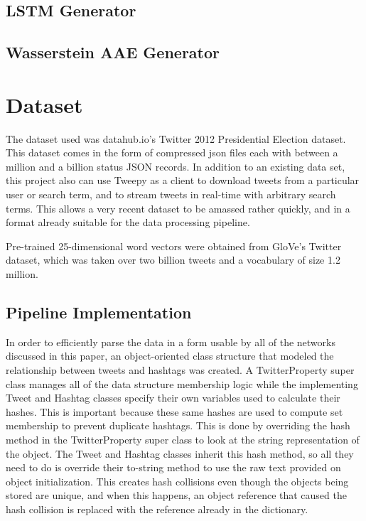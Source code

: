 \documentclass{article}
\begin{document}
	\subsection{LSTM Generator}
	\subsection{Wasserstein AAE Generator}

\section{Dataset}
	The dataset used was datahub.io's Twitter 2012 Presidential Election dataset. This
	dataset comes in the form of compressed json files each with between a million and
	a billion status JSON records. In addition to an existing data set, this project
	also can use Tweepy as a client to download tweets from a particular user or search term,
	and to stream tweets in real-time with arbitrary search terms. This allows a
	very recent dataset to be amassed rather quickly, and in a format already suitable
	for the data processing pipeline.

	Pre-trained 25-dimensional word vectors were obtained from GloVe's Twitter dataset,
	which was taken over two billion tweets and a vocabulary of size 1.2 million.

	\subsection{Pipeline Implementation}
		In order to efficiently parse the data in a form usable by all of the networks discussed
		in this paper, an object-oriented class structure that modeled the relationship between tweets and
		hashtags was created. A TwitterProperty super class manages all of the data structure
		membership logic while the implementing Tweet and Hashtag classes specify
		their own variables used to calculate their hashes. This is important because
		these same hashes are used to compute set membership to prevent duplicate hashtags.
		This is done by overriding the hash method in the TwitterProperty super class to
		look at the string representation of the object. The Tweet and Hashtag classes
		inherit this hash method, so all they need to do is override their to-string method
		to use the raw text provided on object initialization. This creates hash collisions
		even though the objects being stored are unique, and when this happens, an object
		reference that caused the hash collision is replaced with the reference already in the dictionary.
\end{document}
